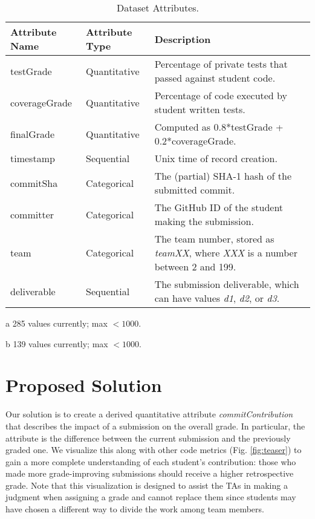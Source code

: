 \documentclass[preprint,journal]{vgtc}       %
\begin{document}
\begin{table*}[t]
  \label{tab:attributes}
  \centering
  \begin{threeparttable}
      \caption{Dataset Attributes.}
  \begin{tabular*}{\textwidth}{lll}
    \hline
    \textbf{Attribute Name} & \textbf{Attribute Type} & \textbf{Description} \\
    \hline
    testGrade      & Quantitative & Percentage of private tests that passed against student code. \\
    coverageGrade  & Quantitative & Percentage of code executed by student written tests. \\
    finalGrade     & Quantitative & Computed as 0.8*testGrade + 0.2*coverageGrade. \\
    timestamp      & Sequential   & Unix time of record creation. \\
    commitSha      & Categorical  & The (partial) SHA-1 hash of the submitted commit. \\
    committer      & Categorical\tnote{a}  & The GitHub ID of the student making the submission. \\
    team           & Categorical\tnote{b}  & The team number, stored as \textit{teamXX}, where \textit{XXX} is a number between 2 and 199. \\
    deliverable    & Sequential   & The submission deliverable, which can have values \textit{d1}, \textit{d2}, or \textit{d3}. \\
    \hline
  \end{tabular*}
  \begin{tablenotes}\footnotesize
    \item [a] 285 values currently; max $<1000$.
    \item [b] 139 values currently; max $<1000$.
\end{tablenotes}
\end{threeparttable}
\end{table*}

\section{Proposed Solution}
Our solution is to create a derived quantitative attribute \textit{commitContribution} that describes
the impact of a submission on the overall grade. In particular, the attribute is
the difference between the current submission and the previously graded one. We
visualize this along with other code metrics (Fig. \ref{fig:teaser}) to gain a more
complete understanding of each student's contribution: those who made more grade-improving
submissions should receive a higher retrospective grade. Note that this visualization
is designed to assist the TAs in
making a judgment when assigning a grade and cannot replace them since students may
have chosen a different way to divide the work among team members.
\end{document}
